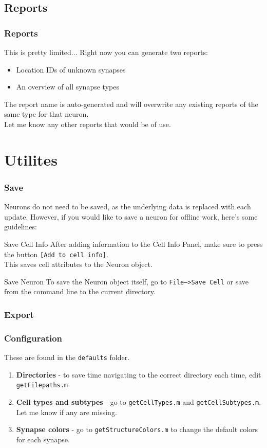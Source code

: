 \documentclass[11pt]{beamer}
\begin{document}
\subsection{Reports}
	\begin{frame}
		\frametitle{Reports}
		This is pretty limited... Right now you can generate two reports:
		\begin{itemize} 
			\item Location IDs of unknown synapses
			\item An overview of all synapse types
		\end{itemize}
		The report name is auto-generated and will overwrite any existing reports of the same type for that neuron.\\Let me know any other reports that would be of use.
	\end{frame}
\section{Utilites}
	\begin{frame}
		\frametitle{Save}
		Neurons do not need to be saved, as the underlying data is replaced with each update. However, if you would like to save a neuron for offline work, here's some guidelines: 
		\begin{block}{Save Cell Info}
			After adding information to the Cell Info Panel, make sure to press the button \texttt{[Add to cell info]}.\\ This saves cell attributes to the Neuron object.
		\end{block}
		\begin{block}{Save Neuron}
			To save the Neuron object itself, go to \texttt{File-->Save Cell} or save from the command line to the current directory. 
		\end{block}
	\end{frame}
\begin{frame}
	\frametitle{Export}
\end{frame}

\begin{frame}
	\frametitle{Configuration}
		These are found in the \texttt{defaults} folder.
		\begin{enumerate}
			\item \textbf{Directories} - to save time navigating to the correct directory each time, edit \texttt{getFilepaths.m}
			\item \textbf{Cell types and subtypes} - go to \texttt{getCellTypes.m} and \texttt{getCellSubtypes.m}. Let me know if any are missing.
			\item \textbf{Synapse colors} - go to \texttt{getStructureColors.m} to change the default colors for each synapse. 
		\end{enumerate}
\end{frame}
\end{document}
